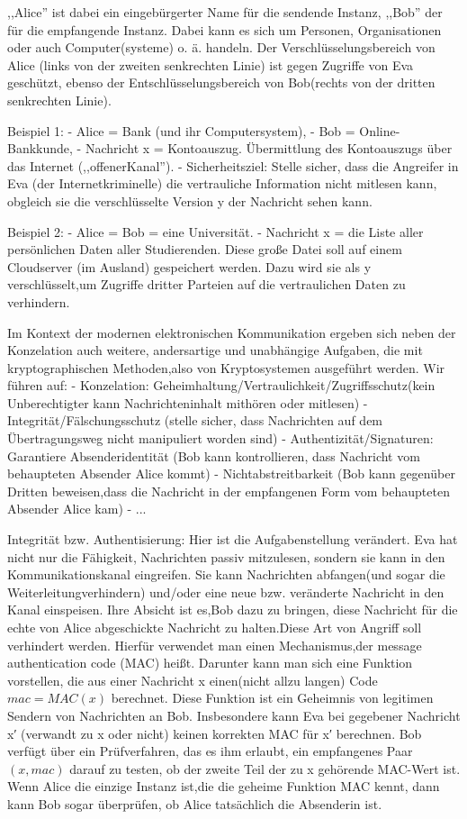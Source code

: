 \documentclass[a4paper]{article}
\begin{document}
\begin{multicols}{3}
    ,,Alice''  ist dabei ein eingebürgerter Name für die sendende Instanz, ,,Bob'' der für die empfangende Instanz. Dabei kann es sich um Personen, Organisationen oder auch Computer(systeme) o. ä. handeln. Der Verschlüsselungsbereich von Alice (links von der zweiten senkrechten Linie) ist gegen Zugriffe von Eva geschützt, ebenso der Entschlüsselungsbereich von Bob(rechts von der dritten senkrechten Linie).

    Beispiel 1:
    - Alice = Bank (und ihr Computersystem),
    - Bob = Online-Bankkunde,
    - Nachricht x = Kontoauszug. Übermittlung des Kontoauszugs über das Internet (,,offenerKanal'').
    - Sicherheitsziel: Stelle sicher, dass die Angreifer in Eva (der Internetkriminelle) die vertrauliche Information nicht mitlesen kann, obgleich sie die verschlüsselte Version y der Nachricht sehen kann.

    Beispiel 2:
    - Alice = Bob = eine Universität.
    - Nachricht x = die Liste aller persönlichen Daten aller Studierenden. Diese große Datei soll auf einem Cloudserver (im Ausland) gespeichert werden. Dazu wird sie als y verschlüsselt,um Zugriffe dritter Parteien auf die vertraulichen Daten zu verhindern.

    Im Kontext der modernen elektronischen Kommunikation ergeben sich neben der Konzelation auch weitere, andersartige und unabhängige Aufgaben, die mit kryptographischen Methoden,also von Kryptosystemen ausgeführt werden. Wir führen auf:
    - Konzelation: Geheimhaltung/Vertraulichkeit/Zugriffsschutz(kein Unberechtigter kann Nachrichteninhalt mithören oder mitlesen)
    - Integrität/Fälschungsschutz (stelle sicher, dass Nachrichten auf dem Übertragungsweg nicht manipuliert worden sind)
    - Authentizität/Signaturen: Garantiere Absenderidentität (Bob kann kontrollieren, dass Nachricht vom behaupteten Absender Alice kommt)
    - Nichtabstreitbarkeit (Bob kann gegenüber Dritten beweisen,dass die Nachricht in der empfangenen Form vom behaupteten Absender Alice kam)
    - ...

    Integrität bzw. Authentisierung: Hier ist die Aufgabenstellung verändert. Eva hat nicht nur die Fähigkeit, Nachrichten passiv mitzulesen, sondern sie kann in den Kommunikationskanal eingreifen. Sie kann Nachrichten abfangen(und sogar die Weiterleitungverhindern) und/oder eine neue bzw. veränderte Nachricht in den Kanal einspeisen. Ihre Absicht ist es,Bob dazu zu bringen, diese Nachricht für die echte von Alice abgeschickte Nachricht zu halten.Diese Art von Angriff soll verhindert werden. Hierfür verwendet man einen Mechanismus,der message authentication code (MAC) heißt. Darunter kann man sich eine Funktion vorstellen, die aus einer Nachricht x einen(nicht allzu langen) Code $mac=MAC(x)$ berechnet. Diese Funktion ist ein Geheimnis von legitimen Sendern von Nachrichten an Bob. Insbesondere kann Eva bei gegebener Nachricht x′ (verwandt zu x oder nicht) keinen korrekten MAC für x′ berechnen. Bob verfügt über ein Prüfverfahren, das es ihm erlaubt, ein empfangenes Paar $(x,mac)$ darauf zu testen, ob der zweite Teil der zu x gehörende MAC-Wert ist. Wenn Alice die einzige Instanz ist,die die geheime Funktion MAC kennt, dann kann Bob sogar überprüfen, ob Alice tatsächlich die Absenderin ist.


\end{multicols}
\end{document}

